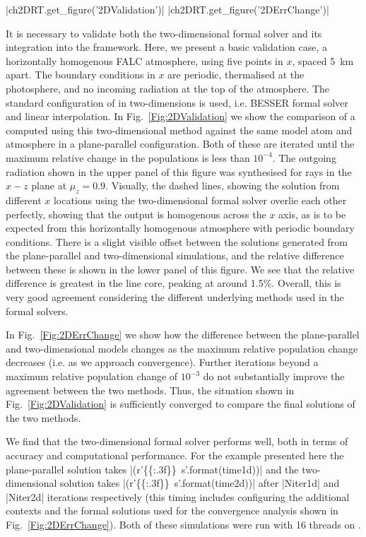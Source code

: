 \py[2DValidation]|ch2DRT.get_figure('2DValidation')|
\py[2DValidation]|ch2DRT.get_figure('2DErrChange')|

It is necessary to validate both the two-dimensional formal solver and its integration into the \Lw{} framework.
Here, we present a basic validation case, a horizontally homogenous FALC atmosphere, using five points in $x$, spaced \SI{5}{\kilo\metre} apart.
The boundary conditions in $x$ are periodic, thermalised at the photosphere, and no incoming radiation at the top of the atmosphere.
The standard configuration of \Lw{} in two-dimensions is used, i.e. BESSER formal solver and linear interpolation.
In Fig.~\ref{Fig:2DValidation} we show the comparison of a \CaLine{} computed using this two-dimensional method against the same model atom and atmosphere in a plane-parallel configuration.
Both of these are iterated until the maximum relative change in the \Caii{} populations is less than $10^{-4}$.
The outgoing radiation shown in the upper panel of this figure was synthesised for rays in the $x-z$ plane at $\mu_z = 0.9$.
Visually, the dashed lines, showing the solution from different $x$ locations using the two-dimensional formal solver overlie each other perfectly, showing that the output is homogenous across the $x$ axis, as is to be expected from this horizontally homogenous atmosphere with periodic boundary conditions.
There is a slight visible offset between the solutions generated from the plane-parallel and two-dimensional simulations, and the relative difference between these is shown in the lower panel of this figure.
We see that the relative difference is greatest in the line core, peaking at around 1.5\%.
Overall, this is very good agreement considering the different underlying methods used in the formal solvers.

In Fig.~\ref{Fig:2DErrChange} we show how the difference between the plane-parallel and two-dimensional models changes as the maximum relative population change decreases (i.e. as we approach convergence).
Further iterations beyond a maximum relative population change of $10^{-3}$ do not substantially improve the agreement between the two methods.
Thus, the situation shown in Fig.~\ref{Fig:2DValidation} is sufficiently converged to compare the final solutions of the two methods.

We find that the two-dimensional formal solver performs well, both in terms of accuracy and computational performance. For the example presented here the plane-parallel solution takes \py[2DValidation]|(r'\SI{{{:.3f}}}{{\second}}'.format(time1d))| and the two-dimensional solution takes \py[2DValidation]|(r'\SI{{{:.3f}}}{{\second}}'.format(time2d))| after \py[2DValidation]|Niter1d| and \py[2DValidation]|Niter2d| iterations respectively (this timing includes configuring the additional contexts and the formal solutions used for the convergence analysis shown in Fig.~\ref{Fig:2DErrChange}).
Both of these simulations were run with 16 threads on .

